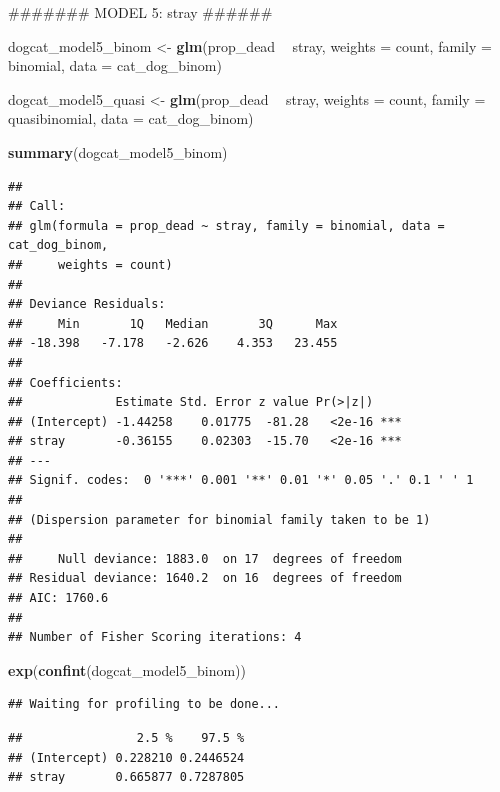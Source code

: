 \documentclass[]{article}
\newenvironment{Shaded}{\begin{snugshade}}{\end{snugshade}}
\newcommand{\KeywordTok}[1]{\textcolor[rgb]{0.13,0.29,0.53}{\textbf{#1}}}
\newcommand{\DataTypeTok}[1]{\textcolor[rgb]{0.13,0.29,0.53}{#1}}
\newcommand{\StringTok}[1]{\textcolor[rgb]{0.31,0.60,0.02}{#1}}
\newcommand{\OperatorTok}[1]{\textcolor[rgb]{0.81,0.36,0.00}{\textbf{#1}}}
\newcommand{\NormalTok}[1]{#1}
\begin{document}
\begin{Shaded}
\begin{Highlighting}[]
\NormalTok{####### MODEL 5: stray ######}

\NormalTok{dogcat_model5_binom <-}\StringTok{ }\KeywordTok{glm}\NormalTok{(prop_dead }\OperatorTok{~}\StringTok{ }\NormalTok{stray, }\DataTypeTok{weights =}\NormalTok{ count, }\DataTypeTok{family =}\NormalTok{ binomial, }\DataTypeTok{data =}\NormalTok{ cat_dog_binom)}

\NormalTok{dogcat_model5_quasi <-}\StringTok{ }\KeywordTok{glm}\NormalTok{(prop_dead }\OperatorTok{~}\StringTok{ }\NormalTok{stray, }\DataTypeTok{weights =}\NormalTok{ count, }\DataTypeTok{family =}\NormalTok{ quasibinomial, }\DataTypeTok{data =}\NormalTok{ cat_dog_binom)}

\KeywordTok{summary}\NormalTok{(dogcat_model5_binom)}
\end{Highlighting}
\end{Shaded}

\begin{verbatim}
## 
## Call:
## glm(formula = prop_dead ~ stray, family = binomial, data = cat_dog_binom, 
##     weights = count)
## 
## Deviance Residuals: 
##     Min       1Q   Median       3Q      Max  
## -18.398   -7.178   -2.626    4.353   23.455  
## 
## Coefficients:
##             Estimate Std. Error z value Pr(>|z|)    
## (Intercept) -1.44258    0.01775  -81.28   <2e-16 ***
## stray       -0.36155    0.02303  -15.70   <2e-16 ***
## ---
## Signif. codes:  0 '***' 0.001 '**' 0.01 '*' 0.05 '.' 0.1 ' ' 1
## 
## (Dispersion parameter for binomial family taken to be 1)
## 
##     Null deviance: 1883.0  on 17  degrees of freedom
## Residual deviance: 1640.2  on 16  degrees of freedom
## AIC: 1760.6
## 
## Number of Fisher Scoring iterations: 4
\end{verbatim}

\begin{Shaded}
\begin{Highlighting}[]
\KeywordTok{exp}\NormalTok{(}\KeywordTok{confint}\NormalTok{(dogcat_model5_binom))}
\end{Highlighting}
\end{Shaded}

\begin{verbatim}
## Waiting for profiling to be done...
\end{verbatim}

\begin{verbatim}
##                2.5 %    97.5 %
## (Intercept) 0.228210 0.2446524
## stray       0.665877 0.7287805
\end{verbatim}
\end{document}
